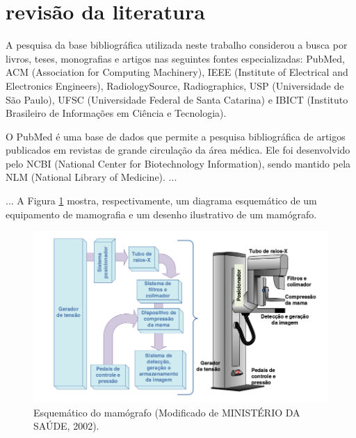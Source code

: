 \section[REVISÃO DA LITERATURA]{revisão da literatura}

A pesquisa da base bibliográfica utilizada neste trabalho considerou a busca por livros,
teses, monografias e artigos nas seguintes fontes especializadas: PubMed, ACM
(Association for Computing Machinery), IEEE (Institute of Electrical and Electronics
Engineers), RadiologySource, Radiographics, USP (Universidade de São Paulo), UFSC
(Universidade Federal de Santa Catarina) e IBICT (Instituto Brasileiro de Informações em
Ciência e Tecnologia).

O PubMed é uma base de dados que permite a pesquisa bibliográfica de artigos
publicados em revistas de grande circulação da área médica. Ele foi desenvolvido pelo
NCBI (National Center for Biotechnology Information), sendo mantido pela NLM
(National Library of Medicine). ...

...
A Figura \ref{esquematico} mostra, respectivamente, um diagrama esquemático de um equipamento de
mamografia e um desenho ilustrativo de um mamógrafo.

\begin{figure}[ht]
 \centering
 \includegraphics[scale=0.45]{figuras/fig1}
 \caption{Esquemático do mamógrafo (Modificado de MINISTÉRIO DA SAÚDE, 2002).}
 \label{esquematico}
\end{figure}





